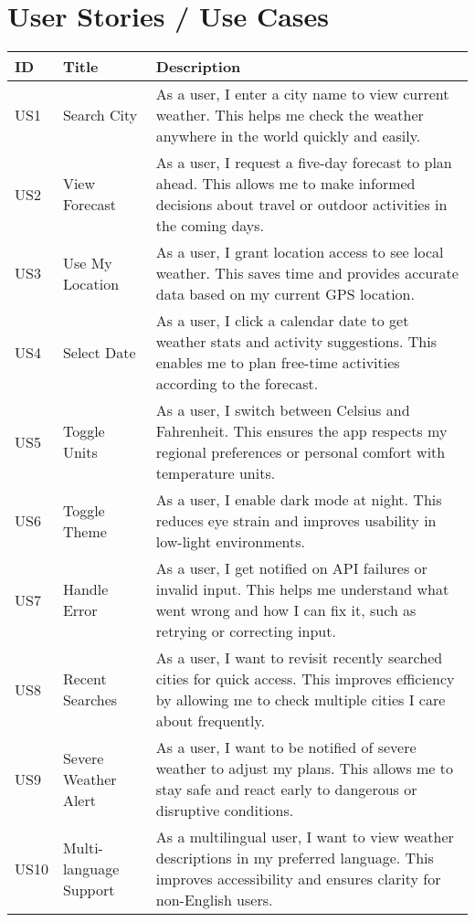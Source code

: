 \documentclass[fontsize=13pt,a4paper]{scrartcl}
\begin{document}
\newpage

\section{User Stories / Use Cases}
\begin{longtable}{|p{1cm}|p{3cm}|p{10cm}|}
\hline
\textbf{ID} & \textbf{Title} & \textbf{Description} \\
\hline
US1 & Search City & As a user, I enter a city name to view current weather. This helps me check the weather anywhere in the world quickly and easily. \\
\hline
US2 & View Forecast & As a user, I request a five-day forecast to plan ahead. This allows me to make informed decisions about travel or outdoor activities in the coming days. \\
\hline
US3 & Use My Location & As a user, I grant location access to see local weather. This saves time and provides accurate data based on my current GPS location. \\
\hline
US4 & Select Date & As a user, I click a calendar date to get weather stats and activity suggestions. This enables me to plan free-time activities according to the forecast. \\
\hline
US5 & Toggle Units & As a user, I switch between Celsius and Fahrenheit. This ensures the app respects my regional preferences or personal comfort with temperature units. \\
\hline
US6 & Toggle Theme & As a user, I enable dark mode at night. This reduces eye strain and improves usability in low-light environments. \\
\hline
US7 & Handle Error & As a user, I get notified on API failures or invalid input. This helps me understand what went wrong and how I can fix it, such as retrying or correcting input. \\
\hline
US8 & Recent Searches & As a user, I want to revisit recently searched cities for quick access. This improves efficiency by allowing me to check multiple cities I care about frequently. \\
\hline
US9 & Severe Weather Alert & As a user, I want to be notified of severe weather to adjust my plans. This allows me to stay safe and react early to dangerous or disruptive conditions. \\
\hline
US10 & Multi-language Support & As a multilingual user, I want to view weather descriptions in my preferred language. This improves accessibility and ensures clarity for non-English users. \\
\hline
\end{longtable}
\end{document}
